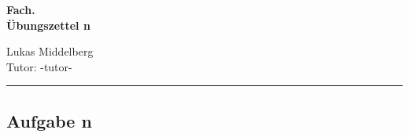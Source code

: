 \documentclass[a4paper, 11pt]{scrartcl}
\begin{document}
{
    \Large 
    \begin{minipage}[c]{10cm}
        \bfseries
        Fach. \\ 
        Übungszettel n
    \end{minipage}
    \hfill
    \begin{minipage}[c]{5cm}
        Lukas Middelberg \\
        Tutor: -tutor-
    \end{minipage}
}
\medskip
\hrule

\subsection*{Aufgabe n}
    
\end{document}
